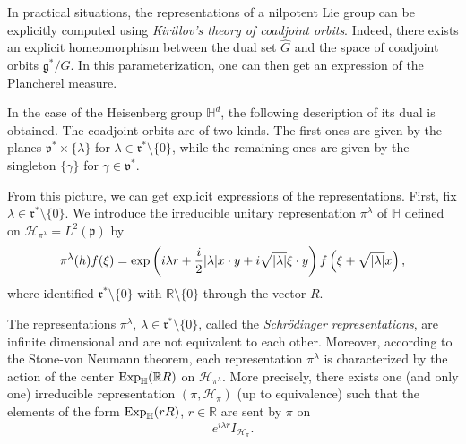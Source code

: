 \documentclass[12pt,a4paper]{amsart}
\theoremstyle{plain}
\theoremstyle{definition}
\theoremstyle{remark}
\numberwithin{equation}{section}
\theoremstyle{definition}
\def\R{{\mathbb R}}%
\def \Exp{{\rm Exp}}
\def \exp{{\rm exp}}
\def \Heis{\mathbb{H}}
\def \Ghat{\widehat{G}}
\def \cH{\mathcal{H}}
\def \fg{\mathfrak{g}}
\def \fv{\mathfrak{v}}
\def \fr{\mathfrak{r}}
\numberwithin{equation}{section}
\begin{document}
In practical situations, the representations of a nilpotent Lie group can be explicitly computed using \emph{Kirillov's theory of coadjoint orbits}. Indeed, there exists an explicit homeomorphism between the dual set $\Ghat$ and the space of coadjoint orbits $\fg^*/ G$. In this parameterization, one can then get an expression of the Plancherel measure. 

\vspace{0.25cm}

In the case of the Heisenberg group $\Heis^d$, the following description of its dual is obtained. The coadjoint orbits are of two kinds. The first ones are given by the planes $\fv^* \times \{\lambda\}$ for $\lambda \in \fr^{*}\setminus\{0\}$, while the remaining ones are given by the singleton $\{\gamma\}$ for $\gamma\in\fv^*$.

From this picture, we can get explicit expressions of the representations. First, fix $\lambda \in \fr^{*}\setminus\{0\}$.
We introduce the irreducible unitary representation $\pi^\lambda$ of $\Heis$ defined on $\cH_{\pi^\lambda} = L^2(\mathfrak{p})$ by 
\begin{equation}
\label{eq:schrodingerrep}
 \pi^\lambda(h)f(\xi) = \exp\left(i \lambda r + \frac{i}{2}|\lambda| x\cdot y + i\sqrt{|\lambda|}\xi\cdot y\right)f\left(\xi+\sqrt{|\lambda|}x\right),
\end{equation}
where identified $\fr^*\setminus\{0\}$ with $\R\setminus\{0\}$ through the vector $R$.

The representations $\pi^\lambda$, $\lambda\in\fr^{*}\setminus\{0\}$, called the \emph{Schrödinger representations}, are infinite dimensional and are not equivalent to each other.
Moreover, according to the Stone-von Neumann theorem, each representation $\pi^\lambda$ is characterized by the action of the center $\Exp_\Heis(\R R)$ on $\cH_{\pi^\lambda}$. More precisely, there exists one (and only one) irreducible representation
$(\pi,\cH_\pi)$ (up to equivalence) such that the elements of the form $\Exp_\Heis(r R)$, $r\in\R$ are sent by $\pi$ on 
\begin{equation*}
 e^{i\lambda r}I_{\cH_\pi}.
\end{equation*}
\end{document}
